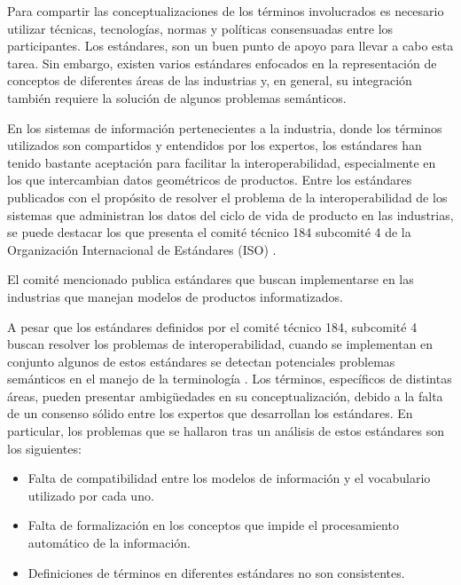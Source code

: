 \documentclass[journal]{IEEEtran}
\begin{document}
Para compartir las conceptualizaciones de los t\'erminos involucrados es necesario utilizar t\'ecnicas, tecnolog\'ias, normas y pol\'iticas consensuadas entre los participantes. Los est\'andares, son un buen punto de apoyo para llevar a cabo esta tarea. Sin embargo, existen varios est\'andares enfocados en la representaci\'on de conceptos de diferentes \'areas de las industrias y, en general, su integraci\'on tambi\'en requiere la soluci\'on de algunos problemas sem\'anticos. 

En los sistemas de informaci\'on pertenecientes a la industria, donde los t\'erminos utilizados son compartidos y entendidos por los expertos, los est\'andares han tenido bastante aceptaci\'on para facilitar la interoperabilidad, especialmente en los que intercambian datos geom\'etricos de productos. Entre los est\'andares publicados con el prop\'osito de resolver el problema de la interoperabilidad de los sistemas que administran los datos del ciclo de vida de producto en las industrias, se puede destacar los que presenta el comit\'e t\'ecnico 184 subcomit\'e 4 de la Organizaci\'on Internacional de Est\'andares (ISO) \cite{Cutting-Decelle2007}. 

El comit\'e mencionado publica est\'andares que buscan implementarse en las industrias que manejan modelos de productos informatizados. 

A pesar que los est\'andares definidos por el comit\'e t\'ecnico 184, subcomit\'e 4 buscan resolver los problemas de interoperabilidad, cuando se implementan en conjunto algunos de estos est\'andares se detectan potenciales problemas sem\'anticos en el manejo de la terminolog\'ia \cite{Young2007}. Los t\'erminos, espec\'ificos de distintas \'areas, pueden presentar ambig\"uedades en su conceptualizaci\'on, debido a la falta de un consenso s\'olido entre los expertos que desarrollan los est\'andares. En particular, los problemas que se hallaron tras un an\'alisis de estos est\'andares son los siguientes:

\begin{itemize}
    \item Falta de compatibilidad entre los modelos de informaci\'on y el vocabulario utilizado por cada uno.
    \item Falta de formalizaci\'on en los conceptos que impide el procesamiento autom\'atico de la informaci\'on. 
    \item Definiciones de t\'erminos en diferentes est\'andares no son consistentes. 
\end{itemize}
\end{document}
